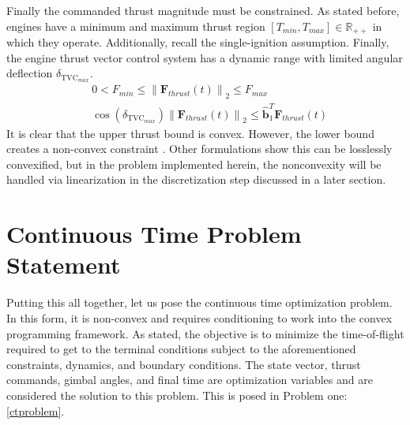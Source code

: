 \documentclass[conf]{new-aiaa}
\begin{document}
Finally the commanded thrust magnitude must be constrained. As stated before, engines have a minimum and maximum thrust region $[T_{min}, T_{max}] \in \mathbb{R}_{++}$ in which they operate. Additionally, recall the single-ignition assumption. Finally, the engine thrust vector control system has a dynamic range with limited angular deflection $\delta_{\text{TVC}_{max}}$.
\begin{align}
& 0 < F_{min} \leq \left \lVert \bm{F}_{thrust}(t) \right \lVert_2 \leq F_{max} \\
& \cos(\delta_{\text{TVC}_{max}}) \left \lVert \bm{F}_{thrust}(t) \right \lVert_2 \leq \hat{\bm{b}}_1^T \bm{F}_{thrust}(t)
\end{align}
It is clear that the upper thrust bound is convex. However, the lower bound creates a non-convex constraint \cite{accikmecse2011lossless}. Other formulations show this can be losslessly convexified, but in the problem implemented herein, the nonconvexity will be handled via linearization in the discretization step discussed in a later section.

%
\section{Continuous Time Problem Statement}

Putting this all together, let us pose the continuous time optimization problem. In this form, it is non-convex and requires conditioning to work into the convex programming framework. As stated, the objective is to minimize the time-of-flight required to get to the terminal conditions subject to the aforementioned constraints, dynamics, and boundary conditions. The state vector, thrust commands, gimbal angles, and final time are optimization variables and are considered the solution to this problem. This is posed in Problem one: \ref{ctproblem}.
\end{document}
